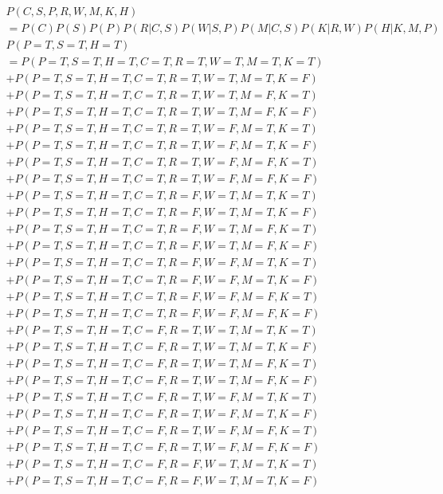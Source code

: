 \documentclass{university}
\begin{document}
\begin{gather*}
    P(C, S, P, R, W, M, K, H) \\
    = P(C) P(S) P(P) P(R|C, S) P(W|S, P) P(M|C, S) P(K|R, W) P(H|K, M, P) \\
    P(P=T, S=T, H=T) \\
    = P(P=T, S=T, H=T, C=T, R=T, W=T, M=T, K=T) \\
    + P(P=T, S=T, H=T, C=T, R=T, W=T, M=T, K=F) \\
    + P(P=T, S=T, H=T, C=T, R=T, W=T, M=F, K=T) \\
    + P(P=T, S=T, H=T, C=T, R=T, W=T, M=F, K=F) \\
    + P(P=T, S=T, H=T, C=T, R=T, W=F, M=T, K=T) \\
    + P(P=T, S=T, H=T, C=T, R=T, W=F, M=T, K=F) \\
    + P(P=T, S=T, H=T, C=T, R=T, W=F, M=F, K=T) \\
    + P(P=T, S=T, H=T, C=T, R=T, W=F, M=F, K=F) \\
    + P(P=T, S=T, H=T, C=T, R=F, W=T, M=T, K=T) \\
    + P(P=T, S=T, H=T, C=T, R=F, W=T, M=T, K=F) \\
    + P(P=T, S=T, H=T, C=T, R=F, W=T, M=F, K=T) \\
    + P(P=T, S=T, H=T, C=T, R=F, W=T, M=F, K=F) \\
    + P(P=T, S=T, H=T, C=T, R=F, W=F, M=T, K=T) \\
    + P(P=T, S=T, H=T, C=T, R=F, W=F, M=T, K=F) \\
    + P(P=T, S=T, H=T, C=T, R=F, W=F, M=F, K=T) \\
    + P(P=T, S=T, H=T, C=T, R=F, W=F, M=F, K=F) \\
    + P(P=T, S=T, H=T, C=F, R=T, W=T, M=T, K=T) \\
    + P(P=T, S=T, H=T, C=F, R=T, W=T, M=T, K=F) \\
    + P(P=T, S=T, H=T, C=F, R=T, W=T, M=F, K=T) \\
    + P(P=T, S=T, H=T, C=F, R=T, W=T, M=F, K=F) \\
    + P(P=T, S=T, H=T, C=F, R=T, W=F, M=T, K=T) \\
    + P(P=T, S=T, H=T, C=F, R=T, W=F, M=T, K=F) \\
    + P(P=T, S=T, H=T, C=F, R=T, W=F, M=F, K=T) \\
    + P(P=T, S=T, H=T, C=F, R=T, W=F, M=F, K=F) \\
    + P(P=T, S=T, H=T, C=F, R=F, W=T, M=T, K=T) \\
    + P(P=T, S=T, H=T, C=F, R=F, W=T, M=T, K=F) \\

\end{gather*}
\end{document}
